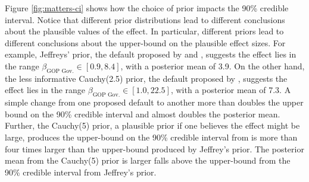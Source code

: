 \documentclass[12pt]{article}
\begin{document}
Figure \ref{fig:matters-ci} shows how the choice of prior impacts the 90\% credible interval. Notice that different prior distributions lead to different conclusions about the plausible values of the effect. In particular, different priors lead to different conclusions about the upper-bound on the plausible effect sizes. For example, Jeffreys' prior, the default proposed by \cite{Zorn2005} and \cite{HeinzeSchemper2002}, suggests the effect lies in the range $\beta_{\text{GOP Gov.}} \in [0.9, 8.4]$, with a posterior mean of 3.9. On the other hand, the less informative Cauchy(2.5) prior, the default proposed by \cite{Gelmanetal2008}, suggests the effect lies in the range $\beta_{\text{GOP Gov.}} \in [1.0, 22.5]$, with a posterior mean of 7.3. A simple change from one proposed default to another more than doubles the upper bound on the 90\% credible interval and almost doubles the posterior mean. Further, the Cauchy(5) prior, a plausible prior if one believes the effect might be large, produces the upper-bound on the 90\% credible interval from is more than four times larger than the upper-bound produced by Jeffrey's prior. The posterior mean from the Cauchy(5) prior is larger falls above the upper-bound from the 90\% credible interval from Jeffrey's prior.
\end{document}
